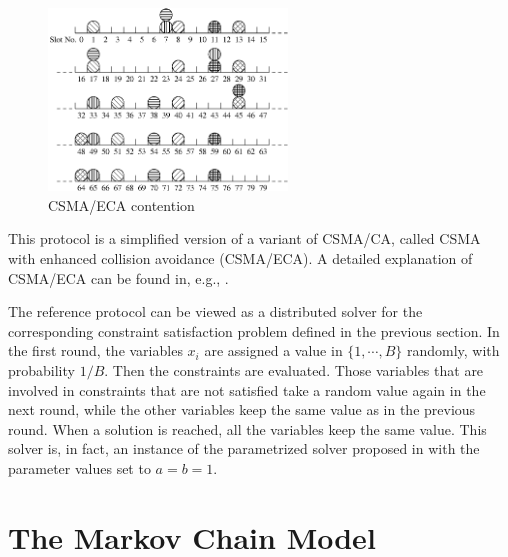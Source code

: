 \documentclass[journal]{IEEEtran}
\newcommand{\Az}[1]{{\color{blue}{#1}}}
\newcommand{\AzDel}[1]{{\color{red}{\{REMOVE: #1\}}}}
\begin{document}
\begin{figure}
  \centering
  \includegraphics[width=2.5in]{figures/csma_eca_compact}
  \caption{CSMA/ECA contention}
  \label{fig:csma_eca_compact}
\end{figure}

This protocol is a simplified version of a variant of CSMA/CA, called CSMA with enhanced collision avoidance (CSMA/ECA). A detailed explanation of CSMA/ECA can be found in, e.g., \cite{barcelo2008lba,barcelo2009tpc,he2009srb,fang2011dlm}.

The reference protocol can be viewed as a distributed solver for the corresponding constraint satisfaction problem defined in the previous section. In the first round, the variables $x_i$ are assigned a value in $\{1,\cdots, B \}$ randomly, with probability $1/B$. Then the constraints are evaluated.
Those variables that are involved in constraints that are not satisfied take a random value again in the next round, while the other variables keep the same value as in the previous round.
When a solution is reached, all the variables keep the same value. This solver is, in fact, an instance of the parametrized solver proposed in \cite{duffy2011dcs} with the parameter values set to $a=b=1$.


\section{The Markov Chain Model}
\label{sec:markov_chain}

\end{document}
